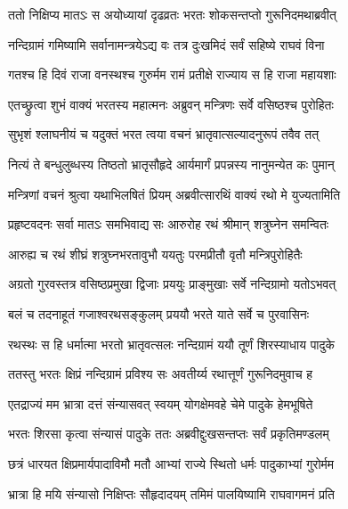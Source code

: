 
\twolineshloka
{ततो निक्षिप्य मातऽः स अयोध्यायां दृढव्रतः}
{भरतः शोकसन्तप्तो गुरूनिदमथाब्रवीत्} %

\twolineshloka
{नन्दिग्रामं गमिष्यामि सर्वानामन्त्रयेऽद्य वः}
{तत्र दुःखमिदं सर्वं सहिष्ये राघवं विना} %

\twolineshloka
{गतश्च हि दिवं राजा वनस्थश्च गुरुर्मम}
{रामं प्रतीक्षे राज्याय स हि राजा महायशाः} %

\twolineshloka
{एतच्छ्रुत्वा शुभं वाक्यं भरतस्य महात्मनः}
{अब्रुवन् मन्त्रिणः सर्वे वसिष्ठश्च पुरोहितः} %

\twolineshloka
{सुभृशं श्लाघनीयं च यदुक्तं भरत त्वया}
{वचनं भ्रातृवात्सल्यादनुरूपं तवैव तत्} %

\twolineshloka
{नित्यं ते बन्धुलुब्धस्य तिष्ठतो भ्रातृसौहृदे}
{आर्यमार्गं प्रपन्नस्य नानुमन्येत कः पुमान्} %

\twolineshloka
{मन्त्रिणां वचनं श्रुत्वा यथाभिलषितं प्रियम्}
{अब्रवीत्सारथिं वाक्यं रथो मे युज्यतामिति} %

\twolineshloka
{प्रहृष्टवदनः सर्वा मातऽः समभिवाद्य सः}
{आरुरोह रथं श्रीमान् शत्रुघ्नेन समन्वितः} %

\twolineshloka
{आरुह्य च रथं शीघ्रं शत्रुघ्नभरतावुभौ}
{ययतुः परमप्रीतौ वृतौ मन्त्रिपुरोहितैः} %

\twolineshloka
{अग्रतो गुरवस्तत्र वसिष्ठप्रमुखा द्विजाः}
{प्रययुः प्राङ्मुखाः सर्वे नन्दिग्रामो यतोऽभवत्} %

\twolineshloka
{बलं च तदनाहूतं गजाश्वरथसङ्कुलम्}
{प्रययौ भरते याते सर्वे च पुरवासिनः} %

\twolineshloka
{रथस्थः स हि धर्मात्मा भरतो भ्रातृवत्सलः}
{नन्दिग्रामं ययौ तूर्णं शिरस्याधाय पादुके} %

\twolineshloka
{ततस्तु भरतः क्षिप्रं नन्दिग्रामं प्रविश्य सः}
{अवतीर्य्य रथात्तूर्णं गुरूनिदमुवाच ह} %

\twolineshloka
{एतद्राज्यं मम भ्रात्रा दत्तं संन्यासवत् स्वयम्}
{योगक्षेमवहे चेमे पादुके हेमभूषिते} %

\twolineshloka
{भरतः शिरसा कृत्वा संन्यासं पादुके ततः}
{अब्रवीद्दुःखसन्तप्तः सर्वं प्रकृतिमण्डलम्} %

\twolineshloka
{छत्रं धारयत क्षिप्रमार्यपादाविमौ मतौ}
{आभ्यां राज्ये स्थितो धर्मः पादुकाभ्यां गुरोर्मम} %

\twolineshloka
{भ्रात्रा हि मयि संन्यासो निक्षिप्तः सौहृदादयम्}
{तमिमं पालयिष्यामि राघवागमनं प्रति} %

